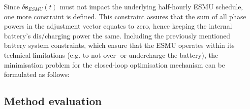 Since $\delta \textbf{s}_{ESMU}(t)$ must not impact the underlying half-hourly ESMU schedule, one more constraint is defined.
This constraint assures that the sum of all phase powers in the adjustment vector equates to zero, hence keeping the internal battery's dis/charging power the same.
Including the previously mentioned battery system constraints, which ensure that the ESMU operates within its technical limitations (e.g. to not over- or undercharge the battery), the minimisation problem for the closed-loop optimisation mechanism can be formulated as follows:



\subsection{Method evaluation}




